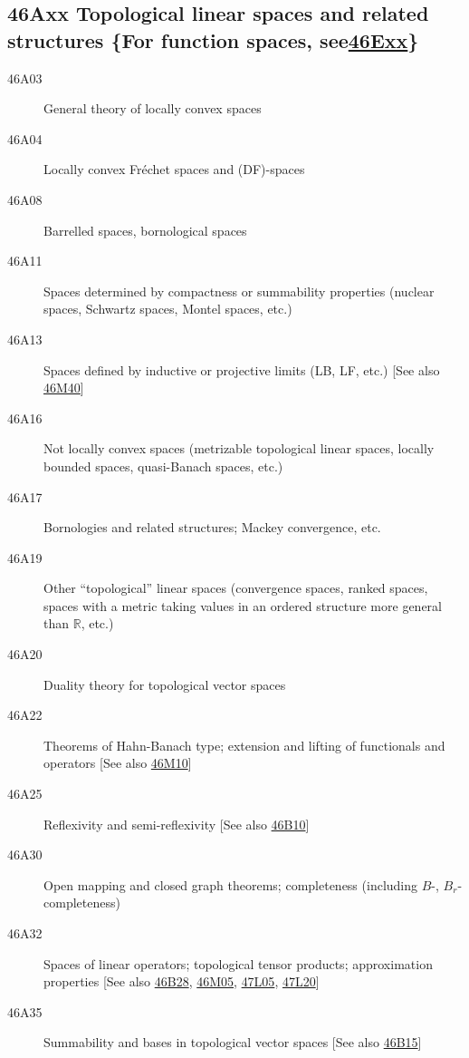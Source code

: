 \documentclass[letterpaper]{article}
\begin{document}
\subsection*{46Axx  Topological linear spaces and related structures \{For function spaces, see\newline \hyperref[46Exx]{46Exx}\} }\label{46Axx}
\begin{description}
\item [46A03]\label{46A03} General theory of locally convex spaces
\item [46A04]\label{46A04} Locally convex Fr\'{e}chet spaces and (DF)-spaces
\item [46A08]\label{46A08} Barrelled spaces, bornological spaces
\item [46A11]\label{46A11} Spaces determined by compactness or summability properties (nuclear spaces, Schwartz spaces, Montel spaces, etc.)
\item [46A13]\label{46A13} Spaces defined by inductive or projective limits (LB, LF, etc.) [See also \hyperref[46M40]{46M40}]
\item [46A16]\label{46A16} Not locally convex spaces (metrizable topological linear spaces, locally bounded spaces, quasi-Banach spaces, etc.)
\item [46A17]\label{46A17} Bornologies and related structures; Mackey convergence, etc.
\item [46A19]\label{46A19} Other ``topological'' linear spaces (convergence spaces, ranked spaces, spaces with a metric taking values in an ordered structure more general than $\mathbb{R}$, etc.)
\item [46A20]\label{46A20} Duality theory  for topological vector spaces
\item [46A22]\label{46A22} Theorems of Hahn-Banach type; extension and lifting of functionals and operators [See also \hyperref[46M10]{46M10}]
\item [46A25]\label{46A25} Reflexivity and semi-reflexivity [See also \hyperref[46B10]{46B10}]
\item [46A30]\label{46A30} Open mapping and closed graph theorems; completeness (including $B$-, $B_r$-completeness)
\item [46A32]\label{46A32} Spaces of linear operators; topological tensor products; approximation properties [See also \hyperref[46B28]{46B28}, \hyperref[46M05]{46M05}, \hyperref[47L05]{47L05}, \hyperref[47L20]{47L20}]
\item [46A35]\label{46A35} Summability and bases in topological vector spaces [See also \hyperref[46B15]{46B15}]

\end{description}
\end{document}
